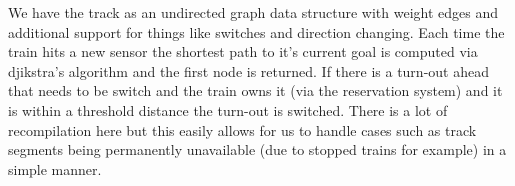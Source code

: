 \documentclass{article}
\begin{document}
We have the track as an undirected graph data structure with weight edges and
additional support for things like switches and direction changing. Each time
the train hits a new sensor the shortest path to it's current goal is computed
via djikstra's algorithm and the first node is returned. If there is a turn-out
ahead that needs to be switch and the train owns it (via the reservation system)
and it is within a threshold distance the turn-out is switched. There is a lot
of recompilation here but this easily allows for us to handle cases such as
track segments being permanently unavailable (due to stopped trains for example)
in a simple manner.
\end{document}
